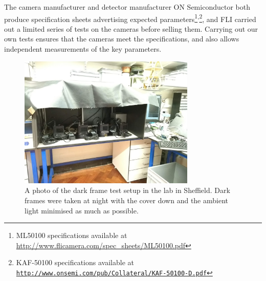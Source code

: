 \begin{colsection}
\begin{colsection}
The camera manufacturer  and detector manufacturer ON Semiconductor both produce specification sheets advertising expected parameters\footnote{ML50100 specifications available at \url{http://www.flicamera.com/spec_sheets/ML50100.pdf}}\textsuperscript{,}\footnote{KAF-50100 specifications available at \href{http://www.onsemi.com/pub/Collateral/KAF-50100-D.PDF}{\texttt{http://www.onsemi.com/pub/Collateral/KAF-50100-D.pdf}}}, and FLI carried out a limited series of tests on the cameras before selling them. Carrying out our own tests ensures that the cameras meet the specifications, and also allows independent measurements of the key parameters.

\begin{figure}[p]
    \begin{center}
        \includegraphics[width=0.75\textwidth]{images/dark_photo.jpg}
    \end{center}
    \caption[The dark frame test setup]{
        A photo of the dark frame test setup in the lab in Sheffield. Dark frames were taken at night with the cover down and the ambient light minimised as much as possible.
    }\label{fig:dark_photo}
\end{figure}


\end{colsection}
\end{colsection}
